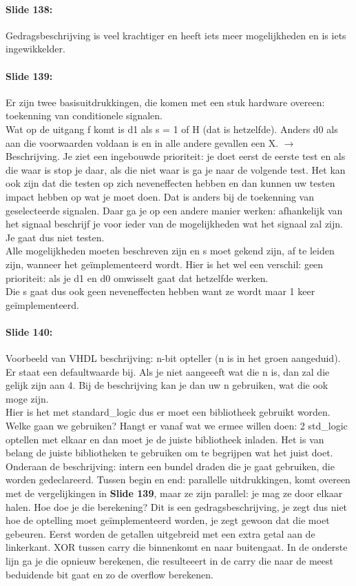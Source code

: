 \documentclass[10pt,a4paper]{book}
\begin{document}
\paragraph{Slide 138:} Gedragsbeschrijving is veel krachtiger en heeft iets meer mogelijkheden en is iets ingewikkelder.

\paragraph{Slide 139:} Er zijn twee basisuitdrukkingen, die komen met een stuk hardware overeen: toekenning van conditionele signalen.\\
Wat op de uitgang f komt is d1 als s = 1 of H (dat is hetzelfde). Anders d0 als aan die voorwaarden voldaan is en in alle andere gevallen een X. $\rightarrow$ Beschrijving. Je ziet een ingebouwde prioriteit: je doet eerst de eerste test en als die waar is stop je daar, als die niet waar is ga je naar de volgende test. Het kan ook zijn dat die testen op zich neveneffecten hebben en dan kunnen uw testen impact hebben op wat je moet doen. Dat is anders bij de toekenning van geselecteerde signalen. Daar ga je op een andere manier werken: afhankelijk van het signaal beschrijf je voor ieder van de mogelijkheden wat het signaal zal zijn. Je gaat dus niet testen.\\
Alle mogelijkheden moeten beschreven zijn en s moet gekend zijn, af te leiden zijn, wanneer het ge\"implementeerd wordt. Hier is het wel een verschil: geen prioriteit: als je d1 en d0 omwisselt gaat dat hetzelfde werken.\\
Die s gaat dus ook geen neveneffecten hebben want ze wordt maar 1 keer ge\"implementeerd.

\paragraph{Slide 140:} Voorbeeld van VHDL beschrijving: n-bit opteller (n is in het groen aangeduid). Er staat een defaultwaarde bij. Als je niet aangeeeft wat die n is, dan zal die gelijk zijn aan 4. Bij de beschrijving kan je dan uw n gebruiken, wat die ook moge zijn.\\
Hier is het met standard\_logic dus er moet een bibliotheek gebruikt worden. Welke gaan we gebruiken? Hangt er vanaf wat we ermee willen doen: 2 std\_logic optellen met elkaar en dan moet je de juiste bibliotheek inladen. Het is van belang de juiste bibliotheken te gebruiken om te begrijpen wat het juist doet.\\
Onderaan de beschrijving: intern een bundel draden die je gaat gebruiken, die worden gedeclareerd. Tussen begin en end: parallelle uitdrukkingen, komt overeen met de vergelijkingen in \textbf{Slide 139}, maar ze zijn parallel: je mag ze door elkaar halen. Hoe doe je die berekening? Dit is een gedragsbeschrijving, je zegt dus niet hoe de optelling moet ge\"implementeerd worden, je zegt gewoon dat die moet gebeuren. Eerst worden de getallen uitgebreid met een extra getal aan de linkerkant. XOR tussen carry die binnenkomt en naar buitengaat. In de onderste lijn ga je die opnieuw berekenen, die resulteeert in de carry die naar de meest beduidende bit gaat en zo de overflow berekenen.
\end{document}
